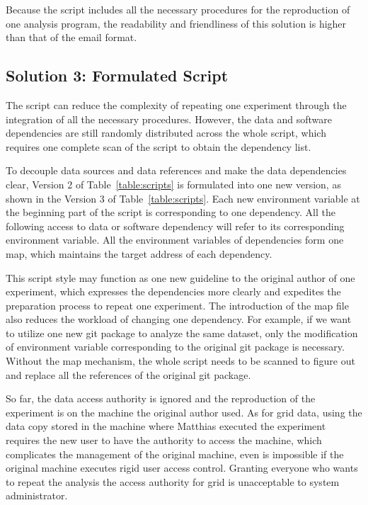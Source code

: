 \documentclass{acm_proc_article-sp}
\begin{document}

Because the script includes all the necessary procedures for the reproduction
of one analysis program, the readability and friendliness of this solution is
higher than that of the email format. 


\subsection{Solution 3: Formulated Script}

The script can reduce the complexity of repeating one experiment through the integration of all the necessary procedures. However, the data and software dependencies are still randomly distributed across the whole script, which requires one complete scan of the script to obtain the  dependency list. 

To decouple data sources and data references and make the data dependencies clear, Version 2 of Table~\ref{table:scripts} is formulated into one new version, as shown in
the Version 3 of Table~\ref{table:scripts}. Each new environment variable at the beginning part of
the script is corresponding to one dependency. All the following access to data
or software dependency will refer to its corresponding environment variable.
All the environment variables of dependencies form one map, which maintains the
target address of each dependency.

This script style may function as one new guideline to the original author of
one experiment, which expresses the dependencies more clearly and expedites the
preparation process to repeat one experiment. The introduction of the map file
also reduces the workload of changing one dependency. For example, if we want
to utilize one new git package to analyze the same dataset, only the modification of
environment variable corresponding to the original git package is necessary.
Without the map mechanism, the whole script needs to be scanned to figure out and
replace all the references of the original git package.

So far, the data access authority is ignored and
the reproduction of the experiment is on the machine the original author used. 
As for grid data, using the data
copy stored in the machine where Matthias executed the experiment requires the
new user to have the authority to access the machine, which complicates the
management of the original machine, even is impossible if the original machine
executes rigid user access control. Granting everyone who wants to repeat the
analysis the access authority for grid is unacceptable to system administrator. 
\end{document}
